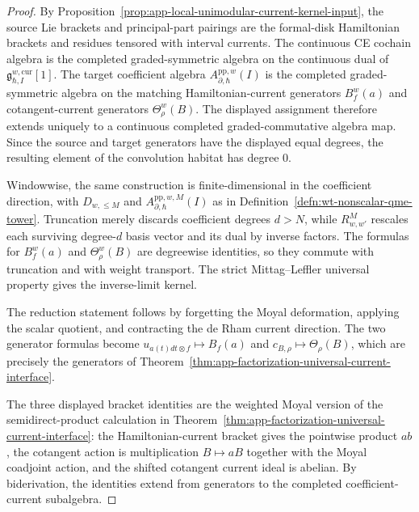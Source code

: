 \begin{proof}
  By
  Proposition~\ref{prop:app-local-unimodular-current-kernel-input}, the
  source Lie brackets and principal-part pairings are the formal-disk
  Hamiltonian brackets and residues tensored with interval currents.  The
  continuous CE cochain algebra is the completed graded-symmetric
  algebra on the continuous dual of
  \(\mathfrak g^{w,\mathrm{cur}}_{\hbar,I}[1]\).  The target coefficient
  algebra \(A^{\mathrm{pp},w}_{\partial,\hbar}(I)\) is the completed
  graded-symmetric algebra on the matching Hamiltonian-current generators
  \(B^w_f(a)\) and cotangent-current generators \(\Theta^w_\rho(B)\).
  The displayed assignment therefore extends uniquely to a continuous
  completed graded-commutative algebra map.  Since the source and target
  generators have the displayed equal degrees, the resulting element of the
  convolution habitat has degree \(0\).

  Windowwise, the same construction is finite-dimensional in the coefficient
  direction, with \(D_{w,\leq M}\) and
  \(A_{\partial,\hbar}^{\mathrm{pp},w,M}(I)\) as in
  Definition~\ref{defn:wt-nonscalar-qme-tower}.  Truncation merely discards
  coefficient degrees \(d>N\), while \(R^M_{w,w'}\) rescales each surviving
  degree-\(d\) basis vector and its dual by inverse factors.  The formulas
  for \(B^w_f(a)\) and \(\Theta^w_\rho(B)\) are degreewise identities, so
  they commute with truncation and with weight transport.  The strict
  Mittag--Leffler universal property gives the inverse-limit kernel.

  The reduction statement follows by forgetting the Moyal deformation,
  applying the scalar quotient, and contracting the de Rham current
  direction.  The two generator formulas become
  \(u_{a(t)dt\otimes f}\mapsto B_f(a)\) and
  \(c_{B,\rho}\mapsto\Theta_\rho(B)\), which are precisely the generators
  of Theorem~\ref{thm:app-factorization-universal-current-interface}.

  The three displayed bracket identities are the weighted Moyal version of
  the semidirect-product calculation in
  Theorem~\ref{thm:app-factorization-universal-current-interface}: the
  Hamiltonian-current bracket gives the pointwise product \(ab\), the
  cotangent action is multiplication \(B\mapsto aB\) together with the
  Moyal coadjoint action, and the shifted cotangent current ideal is
  abelian.  By biderivation, the identities extend from generators to the
  completed coefficient-current subalgebra.


\end{proof}
